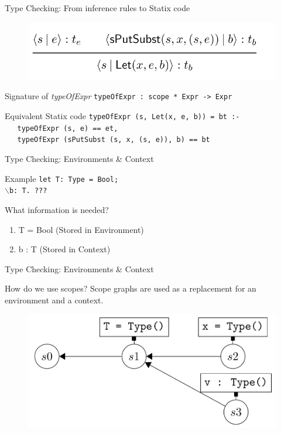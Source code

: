 \documentclass[aspectratio=43]{beamer}
\begin{document}
\begin{frame}[fragile]{Type Checking: From inference rules to Statix code}
	\begin{figure}
		\centering
		\includegraphics[width=0.8\linewidth]{img/screenshot004}
	\end{figure}
	
	\begin{block}{Signature of \emph{typeOfExpr}}
		\texttt{typeOfExpr : scope * Expr -> Expr}
	\end{block}
	
	\begin{exampleblock}{Equivalent Statix code} 
		\texttt{typeOfExpr (s, Let(x, e, b)) = bt :-\\
			\,\, typeOfExpr (s, e) == et, \\
			\,\, typeOfExpr (sPutSubst (s, x, (s, e)), b) == bt}
	\end{exampleblock}
\end{frame}

\begin{frame}[fragile]{Type Checking: Environments \& Context}
	\begin{exampleblock}{Example}
		\texttt{let T: Type = Bool;\\
			$\backslash$b: T. ???
		}
	\end{exampleblock}
	
	\begin{block}{What information is needed?}
		\begin{enumerate}
			\item T = Bool (Stored in Environment)
			\item b : T (Stored in Context)
		\end{enumerate}
	\end{block}
\end{frame}


\begin{frame}[fragile]{Type Checking: Environments \& Context}
	\begin{block}{How do we use scopes?}
		Scope graphs are used as a replacement for an environment and a context.
	\end{block}
	
	\begin{figure}
		\includegraphics[width=0.7\linewidth]{screenshot005}
	\end{figure}
	
\end{frame}
\end{document}
